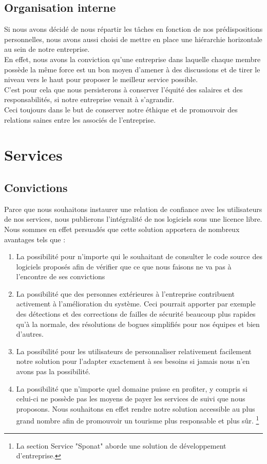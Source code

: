 \section{Organisation interne}

Si nous avons décidé de nous répartir les tâches en fonction de nos prédispositions personnelles, nous avons aussi choisi de mettre en place une hiérarchie horizontale au sein de notre entreprise.\\
En effet, nous avons la conviction qu'une entreprise dans laquelle chaque membre possède la même force est un bon moyen d'amener à des discussions et de tirer le niveau vers le haut pour proposer le meilleur service possible. \\
C'est pour cela que nous persisterons à conserver l'équité des salaires et des responsabilités, si notre entreprise venait à s'agrandir.\\
Ceci toujours dans le but de conserver notre éthique et de promouvoir des relations saines entre les associés de l'entreprise.


\chapter{Services}

\section{Convictions}

Parce que nous souhaitons instaurer une relation de confiance avec les utilisateurs de nos services, nous publierons l'intégralité de nos logiciels sous une licence libre.\n
Nous sommes en effet persuadés que cette solution apportera de nombreux avantages tels que :
\begin{enumerate}
    \item La possibilité pour n'importe qui le souhaitant de consulter le code source des logiciels proposés afin de vérifier que ce que nous faisons ne va pas à l'encontre de ses convictions
    \item La possibilité que des personnes extérieures à l'entreprise contribuent activement à l'amélioration du système. Ceci pourrait apporter par exemple des détections et des corrections de failles de sécurité beaucoup plus rapides qu'à la normale, des résolutions de bogues simplifiés pour nos équipes et bien d'autres.
    \item La possibilité pour les utilisateurs de personnaliser relativement facilement notre solution pour l'adapter exactement à ses besoins si jamais nous n'en avons pas la possibilité.
    \item La possibilité que n'importe quel domaine puisse en profiter, y compris si celui-ci ne possède pas les moyens de payer les services de suivi que nous proposons. Nous souhaitons en effet rendre notre solution accessible au plus grand nombre afin de promouvoir un tourisme plus responsable et plus sûr. \footnote{La section Service "Sponat" aborde une solution de développement d'entreprise.}
\end{enumerate}


